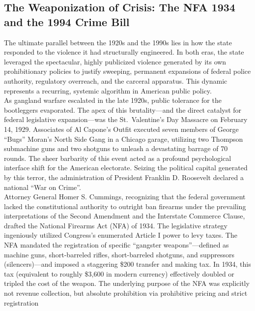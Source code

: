 \documentclass[
]{article}
\begin{document}
\subsection{\texorpdfstring{\textbf{The Weaponization of Crisis: The NFA
1934 and the 1994 Crime
Bill}}{The Weaponization of Crisis: The NFA 1934 and the 1994 Crime Bill}}\label{the-weaponization-of-crisis-the-nfa-1934-and-the-1994-crime-bill}

The ultimate parallel between the 1920s and the 1990s lies in how the
state responded to the violence it had structurally engineered. In both
eras, the state leveraged the spectacular, highly publicized violence
generated by its own prohibitionary policies to justify sweeping,
permanent expansions of federal police authority, regulatory overreach,
and the carceral apparatus. This dynamic represents a recurring,
systemic algorithm in American public policy.\\
As gangland warfare escalated in the late 1920s, public tolerance for
the bootleggers evaporated. The apex of this brutality---and the direct
catalyst for federal legislative expansion---was the St.~Valentine's Day
Massacre on February 14, 1929. Associates of Al Capone's Outfit executed
seven members of George ``Bugs'' Moran's North Side Gang in a Chicago
garage, utilizing two Thompson submachine guns and two shotguns to
unleash a devastating barrage of 70 rounds. The sheer barbarity of this
event acted as a profound psychological interface shift for the American
electorate. Seizing the political capital generated by this terror, the
administration of President Franklin D. Roosevelt declared a national
``War on Crime''.\\
Attorney General Homer S. Cummings, recognizing that the federal
government lacked the constitutional authority to outright ban firearms
under the prevailing interpretations of the Second Amendment and the
Interstate Commerce Clause, drafted the National Firearms Act (NFA) of
1934. The legislative strategy ingeniously utilized Congress's
enumerated Article I power to levy taxes. The NFA mandated the
registration of specific ``gangster weapons''---defined as machine guns,
short-barreled rifles, short-barreled shotguns, and suppressors
(silencers)---and imposed a staggering \$200 transfer and making tax. In
1934, this tax (equivalent to roughly \$3,600 in modern currency)
effectively doubled or tripled the cost of the weapon. The underlying
purpose of the NFA was explicitly not revenue collection, but absolute
prohibition via prohibitive pricing and strict registration
\end{document}
